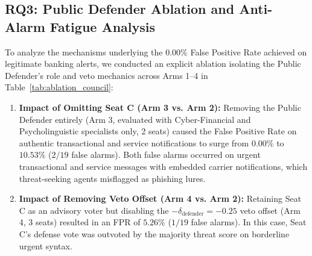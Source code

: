 \documentclass[journal]{IEEEtran}
\begin{document}
\subsection{RQ3: Public Defender Ablation and Anti-Alarm Fatigue Analysis}
\label{subsec:rq3}

To analyze the mechanisms underlying the $0.00\%$ False Positive Rate achieved on legitimate banking alerts, we conducted an explicit ablation isolating the Public Defender's role and veto mechanics across Arms 1--4 in Table~\ref{tab:ablation_council}:
\begin{enumerate}
    \item \textbf{Impact of Omitting Seat C (Arm 3 vs. Arm 2):} Removing the Public Defender entirely (Arm 3, evaluated with Cyber-Financial and Psycholinguistic specialists only, 2 seats) caused the False Positive Rate on authentic transactional and service notifications to surge from $0.00\%$ to $10.53\%$ ($2/19$ false alarms). Both false alarms occurred on urgent transactional and service messages with embedded carrier notifications, which threat-seeking agents misflagged as phishing lures.
    \item \textbf{Impact of Removing Veto Offset (Arm 4 vs. Arm 2):} Retaining Seat C as an advisory voter but disabling the $-\delta_{\text{defender}} = -0.25$ veto offset (Arm 4, 3 seats) resulted in an FPR of $5.26\%$ ($1/19$ false alarms). In this case, Seat C's defense vote was outvoted by the majority threat score on borderline urgent syntax.
\end{enumerate}
\end{document}
